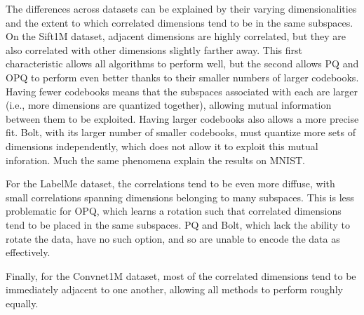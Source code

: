 The differences across datasets can be explained by their varying dimensionalities and the extent to which correlated dimensions tend to be in the same subspaces. On the Sift1M dataset, adjacent dimensions are highly correlated, but they are also correlated with other dimensions slightly farther away. This first characteristic allows all algorithms to perform well, but the second allows PQ and OPQ to perform even better thanks to their smaller numbers of larger codebooks. Having fewer codebooks means that the subspaces associated with each are larger (i.e., more dimensions are quantized together), allowing mutual information between them to be exploited. Having larger codebooks also allows a more precise fit. Bolt, with its larger number of smaller codebooks, must quantize more sets of dimensions independently, which does not allow it to exploit this mutual inforation. Much the same phenomena explain the results on MNIST.

For the LabelMe dataset, the correlations tend to be even more diffuse, with small correlations spanning dimensions belonging to many subspaces. This is less problematic for OPQ, which learns a rotation such that correlated dimensions tend to be placed in the same subspaces. PQ and Bolt, which lack the ability to rotate the data, have no such option, and so are unable to encode the data as effectively.

Finally, for the Convnet1M dataset, most of the correlated dimensions tend to be immediately adjacent to one another, allowing all methods to perform roughly equally.





